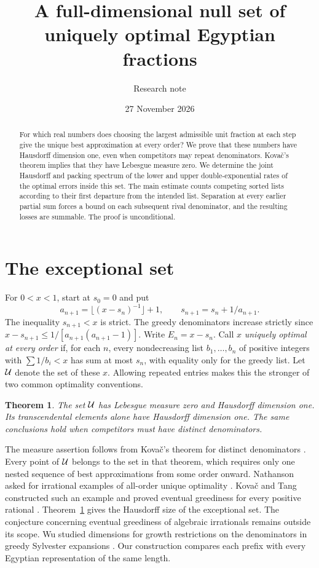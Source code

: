 \documentclass[11pt]{article}
\title{A full-dimensional null set of uniquely optimal Egyptian fractions}
\author{Research note}\date{27 November 2026}
\newtheorem{theorem}{Theorem}[section]\newtheorem{lemma}[theorem]{Lemma}\newtheorem{corollary}[theorem]{Corollary}\newtheorem{proposition}[theorem]{Proposition}
\begin{document}
\maketitle
\begin{abstract}\noindent
For which real numbers does choosing the largest admissible unit fraction at each step give the unique best approximation at every order? We prove that these numbers have Hausdorff dimension one, even when competitors may repeat denominators. Kova\v c's theorem implies that they have Lebesgue measure zero. We determine the joint Hausdorff and packing spectrum of the lower and upper double-exponential rates of the optimal errors inside this set. The main estimate counts competing sorted lists according to their first departure from the intended list. Separation at every earlier partial sum forces a bound on each subsequent rival denominator, and the resulting losses are summable. The proof is unconditional.
\end{abstract}

\section{The exceptional set}
For $0<x<1$, start at $s_0=0$ and put
\[
 a_{n+1}=\lfloor (x-s_n)^{-1}\rfloor+1,\qquad s_{n+1}=s_n+1/a_{n+1}.
\]
The inequality $s_{n+1}<x$ is strict. The greedy denominators increase strictly since $x-s_{n+1}\le 1/[a_{n+1}(a_{n+1}-1)]$. Write $E_n=x-s_n$. Call $x$ \emph{uniquely optimal at every order} if, for each $n$, every nondecreasing list $b_1,\ldots,b_n$ of positive integers with $\sum 1/b_i<x$ has sum at most $s_n$, with equality only for the greedy list. Let $\mathcal U$ denote the set of these $x$. Allowing repeated entries makes this the stronger of two common optimality conventions.

\begin{theorem}\label{thm:full}
The set $\mathcal U$ has Lebesgue measure zero and Hausdorff dimension one. Its transcendental elements alone have Hausdorff dimension one. The same conclusions hold when competitors must have distinct denominators.
\end{theorem}

The measure assertion follows from Kova\v c's theorem for distinct denominators \cite{kovac}. Every point of $\mathcal U$ belongs to the set in that theorem, which requires only one nested sequence of best approximations from some order onward. Nathanson asked for irrational examples of all-order unique optimality \cite{nathanson}. Kova\v c and Tang constructed such an example and proved eventual greediness for every positive rational \cite{kt}. Theorem~\ref{thm:full} gives the Hausdorff size of the exceptional set. The conjecture concerning eventual greediness of algebraic irrationals remains outside its scope. Wu studied dimensions for growth restrictions on the denominators in greedy Sylvester expansions \cite{wu}. Our construction compares each prefix with every Egyptian representation of the same length.
\end{document}
